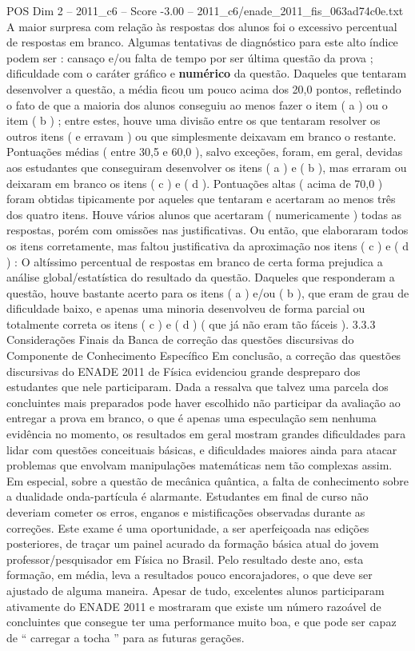 \begin{textsample}{POS Dim 2 – 2011\_c6 – Score -3.00 – 2011\_c6/enade\_2011\_fis\_063ad74c0e.txt}
A maior surpresa com relação às respostas dos alunos foi o excessivo percentual de respostas em branco.
Algumas tentativas de diagnóstico para este alto índice podem ser : cansaço e/ou falta de tempo por ser última questão da prova ; dificuldade com o caráter gráfico e \textbf{numérico} da questão.
Daqueles que tentaram desenvolver a questão, a média ficou um pouco acima dos 20,0 pontos, refletindo o fato de que a maioria dos alunos conseguiu ao menos fazer o item ( a ) ou o item ( b ) ; entre estes, houve uma divisão entre os que tentaram resolver os outros itens ( e erravam ) ou que simplesmente deixavam em branco o restante.
Pontuações médias ( entre 30,5 e 60,0 ), salvo exceções, foram, em geral, devidas aos estudantes que conseguiram desenvolver os itens ( a ) e ( b ), mas erraram ou deixaram em branco os itens ( c ) e ( d ).
Pontuações altas ( acima de 70,0 ) foram obtidas tipicamente por aqueles que tentaram e acertaram ao menos três dos quatro itens.
Houve vários alunos que acertaram ( numericamente ) todas as respostas, porém com omissões nas justificativas.
Ou então, que elaboraram todos os itens corretamente, mas faltou justificativa da aproximação nos itens ( c ) e ( d ) : O altíssimo percentual de respostas em branco de certa forma prejudica a análise global/estatística do resultado da questão.
Daqueles que responderam a questão, houve bastante acerto para os itens ( a ) e/ou ( b ), que eram de grau de dificuldade baixo, e apenas uma minoria desenvolveu de forma parcial ou totalmente correta os itens ( c ) e ( d ) ( que já não eram tão fáceis ). 3.3.3 Considerações Finais da Banca de correção das questões discursivas do Componente de Conhecimento Específico Em conclusão, a correção das questões discursivas do ENADE 2011 de Física evidenciou grande despreparo dos estudantes que nele participaram.
Dada a ressalva que talvez uma parcela dos concluintes mais preparados pode haver escolhido não participar da avaliação ao entregar a prova em branco, o que é apenas uma especulação sem nenhuma evidência no momento, os resultados em geral mostram grandes dificuldades para lidar com questões conceituais básicas, e dificuldades maiores ainda para atacar problemas que envolvam manipulações matemáticas nem tão complexas assim.
Em especial, sobre a questão de mecânica quântica, a falta de conhecimento sobre a dualidade onda-partícula é alarmante.
Estudantes em final de curso não deveriam cometer os erros, enganos e mistificações observadas durante as correções.
Este exame é uma oportunidade, a ser aperfeiçoada nas edições posteriores, de traçar um painel acurado da formação básica atual do jovem professor/pesquisador em Física no Brasil.
Pelo resultado deste ano, esta formação, em média, leva a resultados pouco encorajadores, o que deve ser ajustado de alguma maneira.
Apesar de tudo, excelentes alunos participaram ativamente do ENADE 2011 e mostraram que existe um número razoável de concluintes que consegue ter uma performance muito boa, e que pode ser capaz de “ carregar a tocha ” para as futuras gerações.

\end{textsample}

